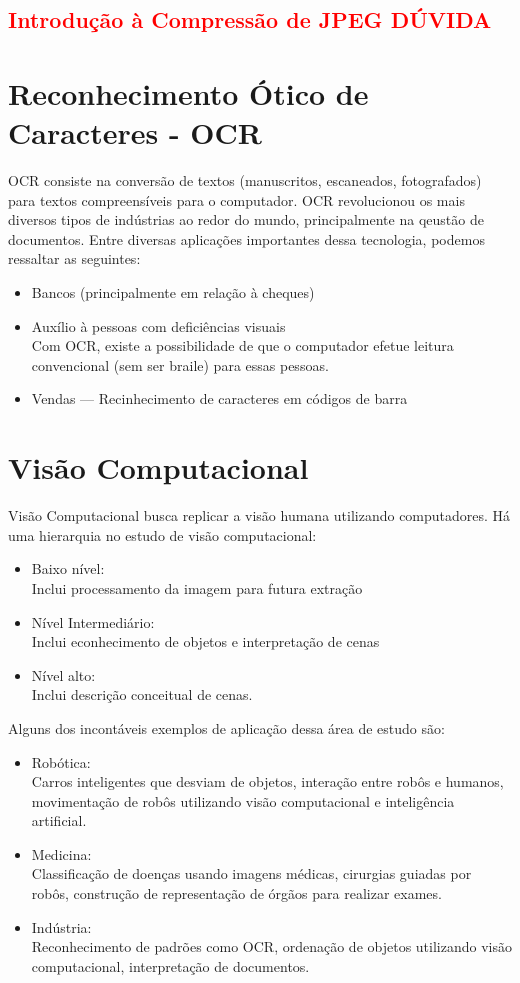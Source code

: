 \documentclass[a4paper, 12pt]{article}
\begin{document}
\textcolor{red}{
\section{Introdução à Compressão de JPEG \textcolor{red}{DÚVIDA}}}

\section{Reconhecimento Ótico de Caracteres - OCR}
OCR consiste na conversão de textos (manuscritos, escaneados, fotografados) para textos compreensíveis para o computador. OCR revolucionou os mais 
diversos tipos de indústrias ao redor do mundo, principalmente na qeustão de documentos. Entre diversas aplicações importantes dessa tecnologia, 
podemos ressaltar as seguintes:
\begin{itemize}
	\item Bancos (principalmente em relação à cheques)
 \item Auxílio à pessoas com deficiências visuais
 \\
 Com OCR, existe a possibilidade de que o computador efetue leitura convencional (sem ser braile) para essas pessoas.

 \item Vendas --- Recinhecimento de caracteres em códigos de barra
\end{itemize}

\section{Visão Computacional}
Visão Computacional busca replicar a visão humana utilizando computadores. Há uma hierarquia no estudo de visão computacional:
\begin{itemize}
	\item Baixo nível:
	\\
	Inclui processamento da imagem para futura extração
	\item Nível Intermediário:
 	\\
	Inclui econhecimento de objetos e interpretação de cenas
	\item Nível alto:
 	\\
	Inclui descrição conceitual de cenas.
\end{itemize}
Alguns dos incontáveis exemplos de aplicação dessa área de estudo são:
\begin{itemize}
	\item Robótica:
 	\\
	Carros inteligentes que desviam de objetos, interação entre robôs e humanos, movimentação de robôs utilizando visão computacional e inteligência 
	artificial.
	\item Medicina:
	\\
	Classificação de doenças usando imagens médicas, cirurgias guiadas por robôs, construção de representação de órgãos para realizar exames.
	\item Indústria:
	\\
	Reconhecimento de padrões como OCR, ordenação de objetos utilizando visão computacional, interpretação de documentos.
\end{itemize}
\end{document}
